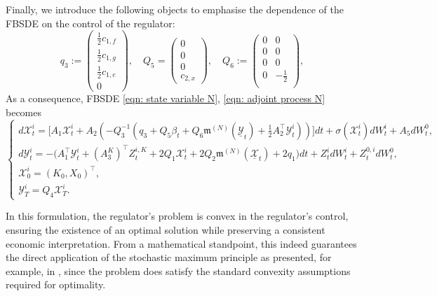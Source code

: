 \documentclass[10pt,a4paper]{amsart}
\numberwithin{equation}{section}
\begin{document}
Finally, we introduce the following objects to emphasise the dependence of the FBSDE on the control of the regulator:
\begin{equation*}
q_3 := 
\begin{pmatrix}
\frac{1}{2}c_{1,f}\\
\frac{1}{2}c_{1,g}\\
\frac{1}{2}c_{1,e}\\
0
\end{pmatrix},\quad 
Q_5=
\begin{pmatrix}
0	\\
0	\\
0	\\
c_{2,x}
\end{pmatrix},
\quad Q_6 :=
\begin{pmatrix}
0	&0\\
0	&0\\
0	&0\\
0	&-\frac{1}{2}\\
\end{pmatrix},
\end{equation*}
As a consequence, FBSDE \eqref{eqn: state variable N}, \eqref{eqn: adjoint process N} becomes
\begin{equation}
\label{eqn: eq FBSDE company i}
\begin{cases}
d\mathcal{X}^i_t = \big[ A_1 \mathcal{X}^i_t + A_2( -Q_3^{-1} ( q_3 + Q_5{\beta}_t + Q_6\mathfrak{m}^{(N)}(\underline{\mathcal{Y}}_t)+ \frac{1}{2}A_2^\top \mathcal{Y}^i_t))\big] dt + \sigma(\mathcal{X}^i_t) dW^i_t + A_5dW^0_t,\\
d\mathcal{Y}^i_t = -\big( A_1^\top \mathcal{Y}^i_t + (A^K_3)^\top Z^{i,K}_t + 2Q_1\mathcal{X}^i_t + 2Q_2 \mathfrak{m}^{(N)}(\underline{\mathcal{X}}_t) + 2q_1 \big)dt + Z^i_t dW^i_t + Z^{0,i}_t dW^0_t ,\\
\mathcal{X}^i_0 = (K_0,X_0)^\top,\\
\mathcal{Y}^i_T = Q_4\mathcal{X}^i_T.
\end{cases}
\end{equation}


In this formulation, the regulator’s problem is convex in the regulator's control, ensuring the existence of an optimal solution while preserving a consistent economic interpretation. 
From a mathematical standpoint, this indeed guarantees the direct application of the stochastic maximum principle as presented, for example, in \cite[Appendix A]{fujii2022equilibrium}, since the problem does satisfy the standard convexity assumptions required for optimality.
\end{document}
